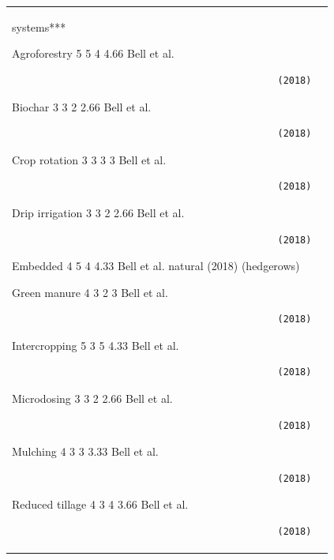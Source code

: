 \documentclass[
  letterpaper,
  DIV=11,
  numbers=noendperiod]{scrreprt}
\begin{document}
\begin{longtable}[]{@{}
  >{\raggedright\arraybackslash}p{}
  >{\raggedright\arraybackslash}p{}@{}}
\begin{minipage}[t]{\linewidth}
systems***

Agroforestry 5 5 4 4.66 Bell et al.

\begin{verbatim}
                                               (2018)
\end{verbatim}

Biochar 3 3 2 2.66 Bell et al.

\begin{verbatim}
                                               (2018)
\end{verbatim}

Crop rotation 3 3 3 3 Bell et al.

\begin{verbatim}
                                               (2018)
\end{verbatim}

Drip irrigation 3 3 2 2.66 Bell et al.

\begin{verbatim}
                                               (2018)
\end{verbatim}

Embedded 4 5 4 4.33 Bell et al. natural (2018) (hedgerows)

Green manure 4 3 2 3 Bell et al.

\begin{verbatim}
                                               (2018)
\end{verbatim}

Intercropping 5 3 5 4.33 Bell et al.

\begin{verbatim}
                                               (2018)
\end{verbatim}

Microdosing 3 3 2 2.66 Bell et al.

\begin{verbatim}
                                               (2018)
\end{verbatim}

Mulching 4 3 3 3.33 Bell et al.

\begin{verbatim}
                                               (2018)
\end{verbatim}

Reduced tillage 4 3 4 3.66 Bell et al.

\begin{verbatim}
                                               (2018)
\end{verbatim}


\end{minipage}
\end{longtable}
\end{document}
